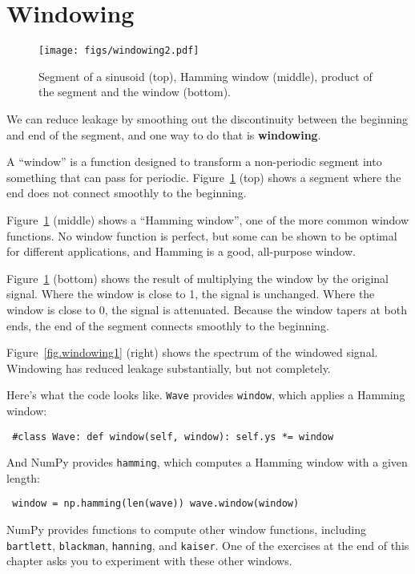 \documentclass[12pt]{book} \usepackage[width=5.5in,height=8.5in, hmarginratio=3:2,vmarginratio=1:1]{geometry}
\begin{document}
\section{Windowing} 

\begin{figure} 

\centerline{\texttt{[image: figs/windowing2.pdf]}} \caption{Segment of a sinusoid (top), Hamming window (middle), product of the segment and the window (bottom).} \label{fig.windowing2} \end{figure} 

We can reduce leakage by smoothing out the discontinuity between the beginning and end of the segment, and one way to do that is {\bf windowing}. 

A ``window'' is a function designed to transform a non-periodic segment into something that can pass for periodic. Figure~\ref{fig.windowing2} (top) shows a segment where the end does not connect smoothly to the beginning. 

Figure~\ref{fig.windowing2} (middle) shows a ``Hamming window'', one of the more common window functions. No window function is perfect, but some can be shown to be optimal for different applications, and Hamming is a good, all-purpose window. 

Figure~\ref{fig.windowing2} (bottom) shows the result of multiplying the window by the original signal. Where the window is close to 1, the signal is unchanged. Where the window is close to 0, the signal is attenuated. Because the window tapers at both ends, the end of the segment connects smoothly to the beginning. 

Figure~\ref{fig.windowing1} (right) shows the spectrum of the windowed signal. Windowing has reduced leakage substantially, but not completely. 

Here's what the code looks like. {\tt Wave} provides {\tt window}, which applies a Hamming window: 

\begin{verbatim} #class Wave: def window(self, window): self.ys *= window \end{verbatim} 

And NumPy provides {\tt hamming}, which computes a Hamming window with a given length: 

\begin{verbatim} window = np.hamming(len(wave)) wave.window(window) \end{verbatim} 

NumPy provides functions to compute other window functions, including {\tt bartlett}, {\tt blackman}, {\tt hanning}, and {\tt kaiser}. One of the exercises at the end of this chapter asks you to experiment with these other windows. 
\end{document}

